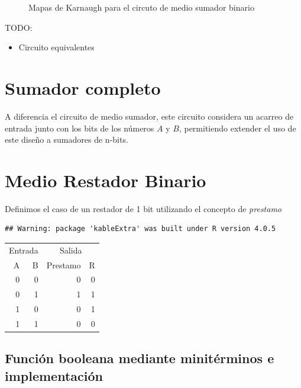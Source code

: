 \documentclass[
]{book}
\providecommand{\tightlist}{%
  \setlength{\itemsep}{0pt}\setlength{\parskip}{0pt}}
\begin{document}
{\begin{figure}
{}

\caption{Mapas de Karnaugh para el circuto de medio sumador binario}\label{fig:unnamed-chunk-1}
\end{figure}

TODO:

\begin{itemize}
\tightlist
\item
  Circuito equivalentes
\end{itemize}

\hypertarget{sumador-completo}{%
\section{Sumador completo}\label{sumador-completo}}

A diferencia el circuito de medio sumador, este circuito considera un acarreo de entrada junto con los bits de los números \(A\) y \(B\), permitiendo extender el uso de este diseño a sumadores de n-bits.

\hypertarget{medio-restador-binario}{%
\section{Medio Restador Binario}\label{medio-restador-binario}}

Definimos el caso de un restador de 1 bit utilizando el concepto de \emph{prestamo}

\begin{verbatim}
## Warning: package 'kableExtra' was built under R version 4.0.5
\end{verbatim}

\begin{table}
\centering
\begin{tabular}{r|r|r|r}
\hline
\multicolumn{2}{c|}{Entrada} & \multicolumn{2}{c}{Salida} \\
\cline{1-2} \cline{3-4}
A & B & Prestamo & R\\
\hline
0 & 0 & 0 & 0\\
\hline
0 & 1 & 1 & 1\\
\hline
1 & 0 & 0 & 1\\
\hline
1 & 1 & 0 & 0\\
\hline
\end{tabular}
\end{table}

\hypertarget{funciuxf3n-booleana-mediante-minituxe9rminos-e-implementaciuxf3n-1}{%
\subsection{Función booleana mediante minitérminos e implementación}\label{funciuxf3n-booleana-mediante-minituxe9rminos-e-implementaciuxf3n-1}}

}
\end{document}
